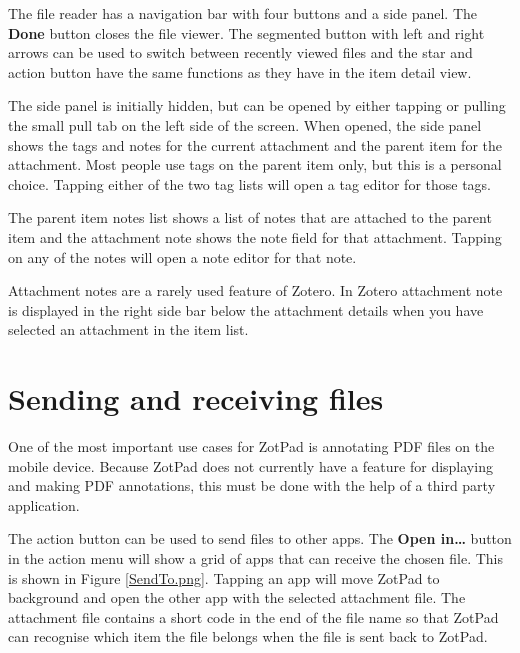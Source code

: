 \documentclass[oneside, openany, 12pt]{tufte-book}
\newcommand{\image}[2]{
	\center
	\fbox{\texttt{[image: images/iPhone/\{\#2]}}}

	\refstepcounter{figure}
	\smallskip\noindent\small Figure \thefigure: #1
	\label{#2}
	}
\newcommand{\ipadfootnote}[1]{}
\newcommand{\image}[2]{
	\caption{#1}
	\label{#2}
	\fbox{\texttt{[image: images/iPad/\{\#2]}}}
	}
\newcommand{\ipadfootnote}[1]{\footnote{#1}}
\begin{document}
The file reader has a navigation bar with four buttons and a side panel. The \textbf{Done} button closes the file viewer. The segmented button with left and right arrows can be used to switch between recently viewed files and the star and action button have the same functions as they have in the item detail view.

\begin{figure}
\image{File viewer}{ReadingMode.png}
\end{figure}


The side panel is initially hidden, but can be opened by either tapping or pulling the small pull tab on the left side of the screen. When opened, the side panel shows the tags and notes for the current attachment and the parent item for the attachment. Most people use tags on the parent item only, but this is a personal choice. Tapping either of the two tag lists will open a tag editor for those tags.

The parent item notes list shows a list of notes that are attached to the parent item and the attachment note shows the note field for that attachment. Tapping on any of the notes will open a note editor for that note.

Attachment notes are a rarely used feature of Zotero. In Zotero attachment note is displayed in the right side bar below the attachment details when you have selected an attachment in the item list.

\FloatBarrier

\section{Sending and receiving files}

One of the most important use cases for ZotPad is annotating PDF files on the mobile device. Because ZotPad does not currently have a feature for displaying and making PDF annotations, this must be done with the help of a third party application\ipadfootnote{Support for annotating PDFs inside ZotPad is planned for a future version}. 

The action button can be used to send files to other apps. The \textbf{Open in\ldots} button in the action menu will show a grid of apps that can receive the chosen file. This is shown in Figure \ref{SendTo.png}. Tapping an app will move ZotPad to background and open the other app with the selected attachment file. The attachment file contains a short code in the end of the file name so that ZotPad can recognise which item the file belongs when the file is sent back to ZotPad.
\end{document}
